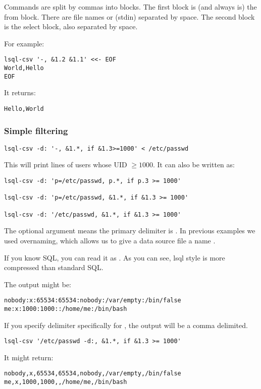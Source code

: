 Commands are split by commas into blocks. The first block is (and always is) the from block. There are file names or \icode{-} (stdin) separated by space. The second block is the select block, also separated by space.

For example:
\begin{verbatim}
lsql-csv '-, &1.2 &1.1' <<- EOF
World,Hello
EOF
\end{verbatim}
It returns:
\begin{verbatim}
Hello,World
\end{verbatim}


\subsubsection{Simple filtering}

\begin{verbatim}
lsql-csv -d: '-, &1.*, if &1.3>=1000' < /etc/passwd
\end{verbatim}
This will print lines of users whose UID $\geq 1000$. It can also be written as:
\begin{verbatim}
lsql-csv -d: 'p=/etc/passwd, p.*, if p.3 >= 1000'
    
lsql-csv -d: 'p=/etc/passwd, &1.*, if &1.3 >= 1000'

lsql-csv -d: '/etc/passwd, &1.*, if &1.3 >= 1000'
\end{verbatim}
The  optional argument means the primary delimiter is \icode{:}. In previous examples we used overnaming, which allows us to give a data source file  a name .

If you know SQL, you can read it as . As you can see, lsql style is more compressed than standard SQL.

The output might be:
\begin{verbatim}
nobody:x:65534:65534:nobody:/var/empty:/bin/false
me:x:1000:1000::/home/me:/bin/bash
\end{verbatim}

If you specify delimiter specifically for , the output will be a comma delimited.
\begin{verbatim}
lsql-csv '/etc/passwd -d:, &1.*, if &1.3 >= 1000'
\end{verbatim}
It might return:
\begin{verbatim}
nobody,x,65534,65534,nobody,/var/empty,/bin/false
me,x,1000,1000,,/home/me,/bin/bash
\end{verbatim}


